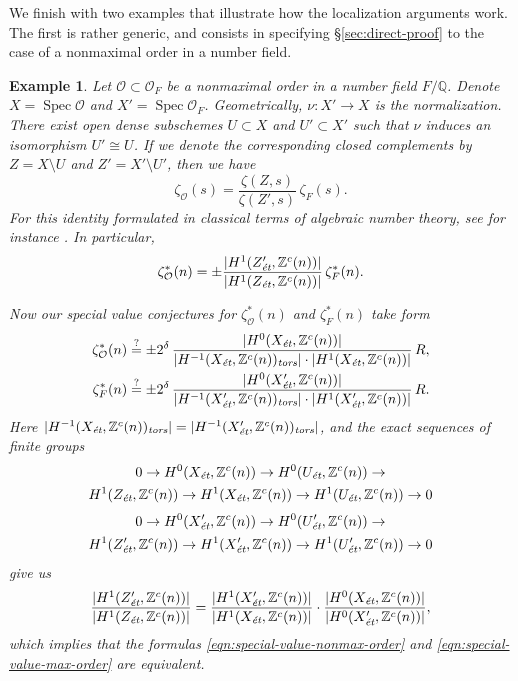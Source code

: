 \documentclass[draft]{article}
\DeclareMathOperator{\Spec}{Spec}
\newcommand{\QQ}{\mathbb{Q}}
\newcommand{\ZZ}{\mathbb{Z}}
\newcommand{\et}{\text{\it \'{e}t}}
\newcommand{\tors}{\text{\it tors}}
\theoremstyle{myplain}
\theoremstyle{mydefinition}
\newtheorem{example}[theorem]{Example}
\numberwithin{equation}{section}
\begin{document}
We finish with two examples that illustrate how the localization arguments
work. The first is rather generic, and consists in specifying
\S\ref{sec:direct-proof} to the case of a nonmaximal order in a number field.

\begin{example}
  Let $\mathcal{O} \subset \mathcal{O}_F$ be a nonmaximal order in a number
  field $F/\QQ$. Denote $X = \Spec \mathcal{O}$ and
  $X' = \Spec \mathcal{O}_F$. Geometrically, $\nu\colon X' \to X$ is the
  normalization. There exist open dense subschemes $U \subset X$ and
  $U' \subset X'$ such that $\nu$ induces an isomorphism $U' \cong U$. If we
  denote the corresponding closed complements by $Z = X\setminus U$ and
  $Z' = X'\setminus U'$, then we have
  $$\zeta_\mathcal{O} (s) = \frac{\zeta (Z,s)}{\zeta (Z',s)}\,\zeta_F (s).$$
  For this identity formulated in classical terms of algebraic number theory,
  see for instance \cite{Jenner-1969}. In particular,
  \[ \zeta^*_\mathcal{O} (n) =
    \pm \frac{|H^1 (Z'_\et, \ZZ^c(n))|}{|H^1 (Z_\et, \ZZ^c(n))|}\,\zeta^*_F (n). \]

  Now our special value conjectures for $\zeta^*_\mathcal{O} (n)$ and
  $\zeta^*_F (n)$ take form
  \begin{align}
    \label{eqn:special-value-nonmax-order}
    \zeta^*_\mathcal{O} (n) & \stackrel{?}{=}
                              \pm 2^\delta\,\frac{|H^0 (X_\et, \ZZ^c (n))|}{|H^{-1} (X_\et, \ZZ^c (n))_\tors|\cdot |H^1 (X_\et, \ZZ^c (n))|}\,R, \\
    \label{eqn:special-value-max-order}
    \zeta^*_F (n) & \stackrel{?}{=}
                    \pm 2^\delta\,\frac{|H^0 (X'_\et, \ZZ^c (n))|}{|H^{-1} (X'_\et, \ZZ^c (n))_\tors|\cdot |H^1 (X'_\et, \ZZ^c (n))|}\,R.
  \end{align}
  Here
  $|H^{-1} (X_\et, \ZZ^c (n))_\tors| = |H^{-1} (X'_\et, \ZZ^c (n))_\tors|$, and
  the exact sequences of finite groups
  \begin{multline*}
    0 \to H^0 (X_\et, \ZZ^c (n)) \to H^0 (U_\et, \ZZ^c (n)) \to \\
    H^1 (Z_\et, \ZZ^c (n)) \to H^1 (X_\et, \ZZ^c (n)) \to H^1 (U_\et, \ZZ^c (n)) \to 0
  \end{multline*}
  \begin{multline*}
    0 \to H^0 (X'_\et, \ZZ^c (n)) \to H^0 (U'_\et, \ZZ^c (n)) \to \\
    H^1 (Z'_\et, \ZZ^c (n)) \to H^1 (X'_\et, \ZZ^c (n)) \to H^1 (U'_\et, \ZZ^c (n)) \to 0
  \end{multline*}
  give us
  \[ \frac{|H^1 (Z'_\et, \ZZ^c (n))|}{|H^1 (Z_\et, \ZZ^c (n))|} =
    \frac{|H^1 (X'_\et, \ZZ^c (n))|}{|H^1 (X_\et, \ZZ^c (n))|}\cdot
    \frac{|H^0 (X_\et, \ZZ^c (n))|}{|H^0 (X'_\et, \ZZ^c (n))|}, \]
  which implies that the formulas \eqref{eqn:special-value-nonmax-order} and
  \eqref{eqn:special-value-max-order} are equivalent.
\end{example}
\end{document}
